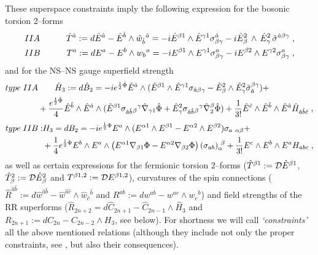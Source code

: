 \documentclass[a4paper,11pt]{article}
\begin{document}
These superspace constraints imply the following expression for the 
bosonic torsion 2--forms 
\begin{eqnarray}
\label{TaIIA=} & IIA \qquad &
\hat{T}^{\hat{a}} 
:= d\hat{E}^{ {\hat{a}}} - 
\hat{E}^{ {\hat{b}}}\wedge 
\hat{w}_{ {\hat{b}}}{}^{ {\hat{a}}}
= - i \hat{E}^{ {\beta}1}\wedge 
\hat{E}^{ {\gamma}1} 
\sigma^{ \hat{a}}_{ {\beta} {\gamma}} - i
\hat{E}_{ {\beta}}^2\, \wedge \, \hat{E}_{ {\gamma}}^2 \,   
\tilde{\sigma}^{\hat{a} {\beta} {\gamma}}
 \; ,
\\ 
\label{TaIIB=} 
& IIB \qquad &
{T}^{ {a}} := d{E}^{ {a}} - 
{E}^{ {b}}\wedge {w}_{ {b}}{}^{ {a}}
= 
- i E^{ {\beta}1} \wedge E^{ {\gamma}1} 
\sigma^{  {a}}_{ {\beta} {\gamma}} - i 
E^{ {\beta}2} \wedge E^{ {\gamma}2}
\sigma^{ {a}}_{ {\beta} {\gamma}} 
 \; ,
\end{eqnarray}
and for the NS--NS gauge superfield strength 
\begin{eqnarray}\label{H3IIA}
type \; IIA & \qquad \hat{H}_3:=  d\hat{B}_2   = - i e^{{1\over 2}\hat{\Phi}} 
\hat{E}^{ \hat{a}} 
\wedge (\hat{E}^{ {\beta}1}\wedge \hat{E}^{ {\gamma}1} 
\sigma_{  \hat{a} {\beta} {\gamma}} - 
\hat{E}_{ {\beta}}^2
\wedge \hat{E}_{ {\gamma}}^2  
\tilde{\sigma}_{ \hat{a}}^{ {\beta} {\gamma}}) +    
\\ \nonumber 
& + {e^{{1\over 2}\hat{\Phi}} \over 4} 
\hat{E}^{ \hat{b}} 
\wedge \hat{E}^{ \hat{a}} 
\wedge ( \hat{E}^{ {\beta}1} 
\sigma_{ \hat{a} \hat{b}}
{}_{ {\beta}}{}^{ {\gamma}} 
\hat{\nabla}_{ {\gamma}1}\hat{\Phi} + 
 \hat{E}_{ {\gamma}}^2 
\sigma_{ \hat{a} \hat{b}}
{}_{ {\beta}}{}^{ {\gamma}} 
\hat{\nabla}^{ {\beta}}_2 \hat{\Phi})   +  
{1\over 3!}  \hat{E}^{ \hat{c}} 
\wedge \hat{E}^{ \hat{b}}
\wedge \hat{E}^{ \hat{a}} 
\hat{H}_{\hat{a}\hat{b}\hat{c}}  \; , 
\end{eqnarray}
\begin{eqnarray}\label{H3IIB}
type \; IIB : & {H}_3=  d{B}_2  = 
- i e^{{1 \over 2}\Phi} E^{ {a}} \wedge
(E^{ {\alpha}1} \wedge E^{ {\beta}1} -
E^{ {\alpha}2} \wedge E^{ {\beta}2})
\sigma_{ {a}~ {\alpha} {\beta}} + 
\\ \nonumber 
& + {1 \over 4} e^{{1 \over 2}\Phi}  
E^{ {b}} \wedge E^{ {a}}  \wedge
   \left( E^{ {\alpha}1} \nabla_{ {\beta}1}\Phi -
   E^{ {\alpha}2} \nabla_{ {\beta}2}\Phi\right)
   (\sigma_{ {a} {b}})_{ {\alpha}}^{~ {\beta}}
   + {1 \over 3!}
    E^{ {c}}  \wedge
    E^{ {b}}  \wedge
    E^{ {a}} H_{ {a}  {b} {c}}
    \; ,  
\end{eqnarray} 
as well as certain expressions  for the fermionic torsion $2$--forms
($\hat{T}^{ {\beta}1}:= {\cal D} \hat{E}^{ {\beta}1}$, 
 $\hat{T}_{ {\beta}}^2:= {\cal D} \hat{E}_{ {\beta}}^2$ and 
${T}^{ {\beta}1,2}:= {\cal D} {E}^{ {\beta}1,2}$), 
curvatures of the spin connections 
($\hat{R}^{\hat{a}\hat{b}}:= d \hat{w}^{\hat{a}\hat{b}} - 
\hat{w}^{\hat{a}\hat{c}}\wedge \hat{w}_{\hat{c}}{}^{\hat{b}}$ and 
${R}^{{a}{b}}:= d {w}^{{a}{b}} - 
{w}^{{a}{c}}\wedge {w}_{{c}}{}^{{b}}$) and field strengths of the RR 
superforms ($\hat{R}_{2n+2}=d\hat{C}_{2n+1} - \hat{C}_{2n-1} \wedge \hat{H}_3$
and 
$R_{2n+1}:=dC_{2n} - C_{2n-2} \wedge H_3$, see below). For shortness we  
will call {\sl `constraints'}  
all the above mentioned relations (although they include not only  
the proper constraints, see \cite{AlgC,HW84,CGO87}, but also 
their consequences).
\end{document}
